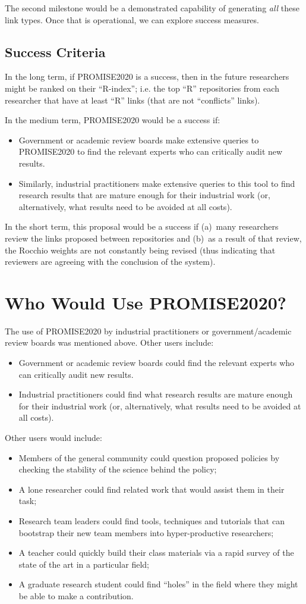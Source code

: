 \documentclass[journal]{IEEEtran}
\newcommand{\bi}{\begin{itemize}}
\newcommand{\ei}{\end{itemize}}
\begin{document}
The second milestone would be a demonstrated capability of generating {\em all} these link
types. Once that is operational, we can explore success measures.

\subsection{Success Criteria}
In the long term,
if PROMISE2020  is a success,
then in the future researchers might be ranked on their ``R-index''; i.e. the
top ``R'' repositories from each researcher that  have at least ``R'' links (that are not ``conflicts'' links).

In the medium term, PROMISE2020 would be a success if:
\bi
\item
Government or academic review boards make extensive queries to PROMISE2020
to find the relevant experts
   who can critically audit new results.
   \item
   Similarly, 
industrial practitioners make extensive queries to this tool to find
  research results that are mature
   enough for their industrial work (or, alternatively, what results need to be avoided at all costs). 
   \ei
In the short term, this proposal would be a success if (a)~many researchers review the links proposed between repositories and (b)~as a result of that review, the Rocchio weights are not constantly being revised (thus indicating that reviewers are agreeing with the conclusion
of the system).



\section{Who Would Use PROMISE2020?}

The use of PROMISE2020 by industrial practitioners or government/academic review boards
was mentioned above. Other users include: 
\bi
\item
 Government or academic review boards could   find the relevant experts
   who can critically audit new results.
   \item
Industrial practitioners could   find what research results are mature
   enough for their industrial work (or, alternatively, what results need to be avoided at all costs). 
   \ei
Other users would include:

     \bi
    
   \item
   Members of the general community could question proposed policies by
   checking the stability of the science behind the policy;
  \item
   A lone researcher could find related work that would assist them in their task;
      \item
   Research  team leaders could find tools, techniques and tutorials that can bootstrap their new team members into hyper-productive researchers;
  \item
   A teacher could quickly build their class materials via a rapid
   survey of the state of the art in a particular field;
   \item
   A graduate research student could find ``holes'' in the field
   where they might be able to make a contribution.
   \ei
\end{document}
